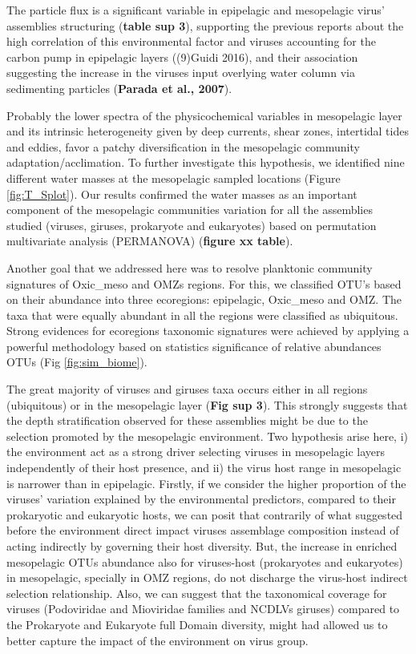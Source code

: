 \documentclass[fleqn,10pt]{wlscirep}
\begin{document}
The particle flux is a significant variable in epipelagic and mesopelagic virus’ assemblies structuring (\textbf{table sup 3}), supporting the previous reports about the high correlation of this environmental factor and viruses accounting for the carbon pump in epipelagic layers ((9)Guidi 2016), and their association suggesting the increase in the viruses input overlying water column via sedimenting particles (\textbf{Parada et al., 2007}).

Probably the lower spectra of the physicochemical variables in mesopelagic layer and its intrinsic heterogeneity given by deep currents, shear zones, intertidal tides and eddies, favor a patchy diversification in the mesopelagic community adaptation/acclimation. To further investigate this hypothesis, we identified nine different water masses at the mesopelagic sampled locations (Figure \ref{fig:T_Splot}). Our results confirmed the water masses as an important component of the mesopelagic communities variation for all the assemblies studied (viruses, giruses, prokaryote and eukaryotes) based on permutation multivariate analysis (PERMANOVA) (\textbf{figure xx table}).

Another goal that we addressed here was to resolve planktonic community signatures of Oxic\_meso and OMZs regions. For this, we classified OTU’s based on their abundance into three ecoregions: epipelagic, Oxic\_meso and OMZ. The taxa that were equally abundant in all the regions were classified as ubiquitous. Strong evidences for ecoregions taxonomic signatures were achieved by applying a powerful methodology based on statistics significance of relative abundances OTUs (Fig \ref{fig:sim_biome}).

The great majority of viruses and giruses taxa occurs either in all regions (ubiquitous) or in the mesopelagic layer (\textbf{Fig sup 3}). This strongly suggests that the depth stratification observed for these assemblies might be due to the selection promoted by the mesopelagic environment. Two hypothesis arise here, i) the environment act as a strong driver selecting viruses in mesopelagic layers independently of their host presence, and ii) the virus host range in mesopelagic is narrower than in epipelagic. Firstly, if we consider the higher proportion of the viruses’ variation explained by the environmental predictors, compared to their prokaryotic and eukaryotic hosts, we can posit that contrarily of what suggested before the environment direct impact viruses assemblage composition instead of acting indirectly by governing their host diversity. But, the increase in enriched mesopelagic OTUs abundance also for viruses-host (prokaryotes and eukaryotes) in mesopelagic, specially in OMZ regions, do not discharge the virus-host indirect selection relationship. Also, we can suggest that the taxonomical coverage for viruses (Podoviridae and Mioviridae families and NCDLVs giruses) compared to the Prokaryote and Eukaryote full Domain diversity, might had allowed us to better capture the impact of the environment on virus group.
\end{document}
